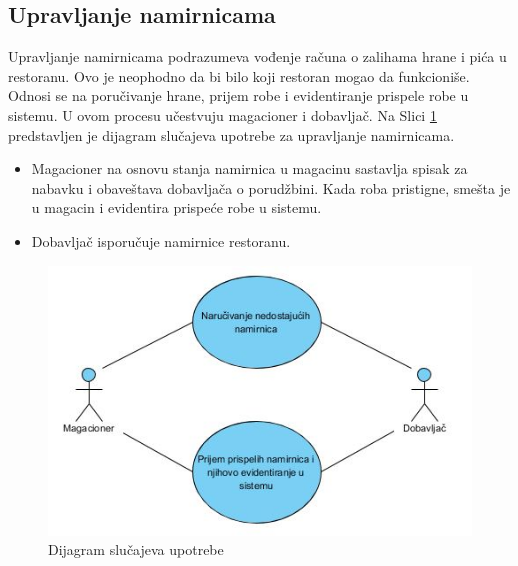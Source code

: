  
 \subsection{Upravljanje namirnicama}
 Upravljanje namirnicama podrazumeva vođenje računa o zalihama hrane i pića u restoranu. Ovo je neophodno da bi bilo koji restoran mogao da funkcioniše. Odnosi se na poručivanje hrane, prijem robe i evidentiranje prispele robe u sistemu. U ovom procesu učestvuju magacioner i dobavljač.
 Na Slici \ref{fig:slika5} predstavljen je dijagram slučajeva upotrebe za upravljanje namirnicama.
 
 \begin{itemize}
     \item Magacioner na osnovu stanja namirnica u magacinu sastavlja spisak za nabavku i obaveštava dobavljača o porudžbini. Kada roba pristigne, smešta je u magacin i evidentira prispeće robe u sistemu.
     \item Dobavljač isporučuje namirnice restoranu.
 \end{itemize}

\begin{figure}[ht]
    \leavevmode
    \begin{center}
    \includegraphics[height=0.5\textheight]{slike/Upravljanje_namirnicama.JPG}
    \end{center}
    \caption{Dijagram slu\v cajeva upotrebe} %
    \label{fig:slika5}
\end{figure}
 
